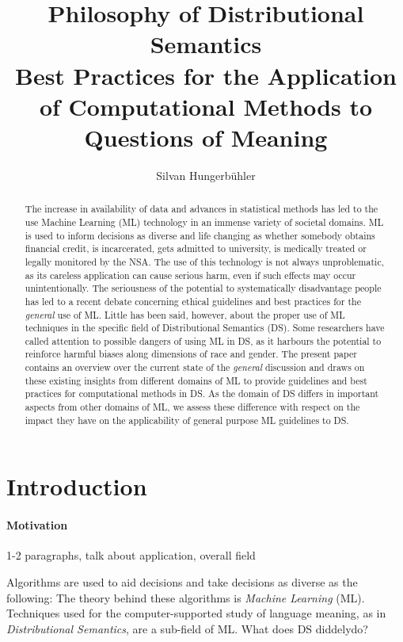 \documentclass{article}
\title{Philosophy of Distributional Semantics\\
\large Best Practices for the Application of Computational Methods to Questions of Meaning}
\date{}
\author{Silvan Hungerb{\"u}hler}
\begin{document}
\maketitle
\begin{abstract}
The increase in availability of data and advances in statistical methods has led to the use Machine Learning (ML) technology in an immense variety of societal domains. ML is used to inform decisions as diverse and life changing as whether somebody obtains financial credit, is incarcerated, gets admitted to university, is medically treated or legally monitored by the NSA.
The use of this technology is not always unproblematic, as its careless application can cause serious harm, even if such effects may occur unintentionally.
The seriousness of the potential to systematically disadvantage people has led to a recent debate concerning ethical guidelines and best practices for the \emph{general} use of ML.
Little has been said, however, about the proper use of ML techniques in the specific field of Distributional Semantics (DS). Some researchers have called attention to possible dangers of using ML in DS, as it harbours the potential to reinforce harmful biases along dimensions of race and gender.
The present paper contains an overview over the current state of the \emph{general} discussion 
and draws on these existing insights from different domains of ML to provide guidelines and best practices for computational methods in DS.
As the domain of DS differs in important aspects from other domains of ML, 
we assess these difference with respect on the impact they have on the applicability of general purpose ML guidelines to DS.
\end{abstract}
\section{Introduction}
\paragraph{Motivation}
1-2 paragraphs, talk about application, overall field

Algorithms are used to aid decisions and take decisions as diverse as the following: %
The theory behind these algorithms is \emph{Machine Learning} (ML).\\

Techniques used for the computer-supported study of language meaning, as in \emph{Distributional Semantics}, are a sub-field of ML.
What does DS diddelydo?
\end{document}
